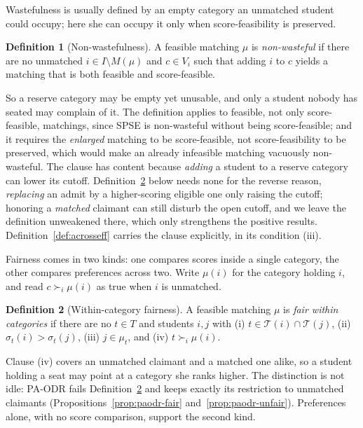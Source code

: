 \documentclass[a4paper,twoside]{article}
\theoremstyle{definition}
\newtheorem{definition}{Definition}
\renewcommand{\T}{\mathcal{T}}
\begin{document}
Wastefulness is usually defined by an empty category an unmatched student could occupy; here she can occupy it only when score-feasibility is preserved.

\begin{definition}[Non-wastefulness]
\label{def:nw}
A feasible matching $\mu$ is \emph{non-wasteful} if there are no unmatched $i\in I\setminus M(\mu)$ and $c\in V_i$ such that adding $i$ to $c$ yields a matching that is both feasible and score-feasible.
\end{definition}

So a reserve category may be empty yet unusable, and only a student nobody has seated may complain of it. The definition applies to feasible, not only score-feasible, matchings, since SPSE is non-wasteful without being score-feasible; and it requires the \emph{enlarged} matching to be score-feasible, not score-feasibility to be preserved, which would make an already infeasible matching vacuously non-wasteful. The clause has content because \emph{adding} a student to a reserve category can lower its cutoff. Definition~\ref{def:fair} below needs none for the reverse reason, \emph{replacing} an admit by a higher-scoring eligible one only raising the cutoff; honoring a \emph{matched} claimant can still disturb the open cutoff, and we leave the definition unweakened there, which only strengthens the positive results. Definition~\ref{def:acrosseff} carries the clause explicitly, in its condition (iii).

Fairness comes in two kinds: one compares scores inside a single category, the other compares preferences across two. Write $\mu(i)$ for the category holding $i$, and read $c\succ_i\mu(i)$ as true when $i$ is unmatched.

\begin{definition}[Within-category fairness]
\label{def:fair}
A feasible matching $\mu$ is \emph{fair within categories} if there are no $t\in T$ and students $i,j$ with (i) $t\in\T(i)\cap\T(j)$, (ii) $\sigma_t(i)>\sigma_t(j)$, (iii) $j\in\mu_t$, and (iv) $t\succ_i\mu(i)$.
\end{definition}

Clause (iv) covers an unmatched claimant and a matched one alike, so a student holding a seat may point at a category she ranks higher. The distinction is not idle: PA-ODR fails Definition~\ref{def:fair} and keeps exactly its restriction to unmatched claimants (Propositions~\ref{prop:paodr-fair} and~\ref{prop:paodr-unfair}). Preferences alone, with no score comparison, support the second kind.
\end{document}
